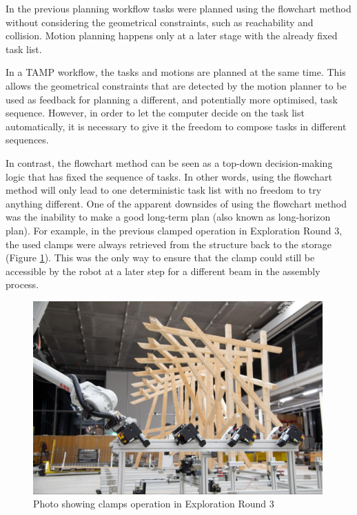 In the previous planning workflow  tasks were planned using the flowchart method  without considering the geometrical constraints, such as reachability and collision. Motion planning happens only at a later stage with the already fixed task list. 

In a TAMP workflow, the tasks and motions are planned at the same time. This allows the geometrical constraints that are detected by the motion planner to be used as feedback for planning a different, and potentially more optimised, task sequence. However, in order to let the computer decide on the task list automatically, it is necessary to give it the freedom to compose tasks in different sequences. 

In contrast, the flowchart method can be seen as a top-down decision-making logic that has fixed the sequence of tasks. In other words, using the flowchart method will only lead to one deterministic task list with no freedom to try anything different. One of the apparent downsides of using the flowchart method was the inability to make a good long-term plan (also known as long-horizon plan). For example, in the previous clamped operation in Exploration Round 3, the used clamps were always retrieved from the structure back to the storage (Figure \ref{fig:photo-clamps-operation-round-3}). This was the only way to ensure that the clamp could still be accessible by the robot at a later step for a different beam in the assembly process. 

\begin{figure}[!h]
    \centering
    \includegraphics[width=0.99\textwidth]{images/08/img02.jpg}
    \caption{Photo showing clamps operation in Exploration Round 3}
    \label{fig:photo-clamps-operation-round-3}
\end{figure}


